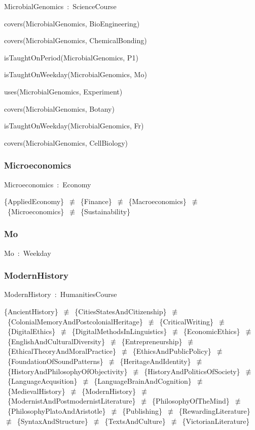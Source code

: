 \documentclass{article}
\begin{document}
MicrobialGenomics~:~ScienceCourse

covers(MicrobialGenomics, BioEngineering)

covers(MicrobialGenomics, ChemicalBonding)

isTaughtOnPeriod(MicrobialGenomics, P1)

isTaughtOnWeekday(MicrobialGenomics, Mo)

uses(MicrobialGenomics, Experiment)

covers(MicrobialGenomics, Botany)

isTaughtOnWeekday(MicrobialGenomics, Fr)

covers(MicrobialGenomics, CellBiology)

\subsubsection*{Microeconomics}

Microeconomics~:~Economy

\{AppliedEconomy\}~\ensuremath{\not\equiv}~\{Finance\}~\ensuremath{\not\equiv}~\{Macroeconomics\}~\ensuremath{\not\equiv}~\{Microeconomics\}~\ensuremath{\not\equiv}~\{Sustainability\}

\subsubsection*{Mo}

Mo~:~Weekday

\subsubsection*{ModernHistory}

ModernHistory~:~HumanitiesCourse

\{AncientHistory\}~\ensuremath{\not\equiv}~\{CitiesStatesAndCitizenship\}~\ensuremath{\not\equiv}~\{ColonialMemoryAndPostcolonialHeritage\}~\ensuremath{\not\equiv}~\{CriticalWriting\}~\ensuremath{\not\equiv}~\{DigitalEthics\}~\ensuremath{\not\equiv}~\{DigitalMethodsInLinguistics\}~\ensuremath{\not\equiv}~\{EconomicEthics\}~\ensuremath{\not\equiv}~\{EnglishAndCulturalDiversity\}~\ensuremath{\not\equiv}~\{Entrepreneurship\}~\ensuremath{\not\equiv}~\{EthicalTheoryAndMoralPractice\}~\ensuremath{\not\equiv}~\{EthicsAndPublicPolicy\}~\ensuremath{\not\equiv}~\{FoundationOfSoundPatterns\}~\ensuremath{\not\equiv}~\{HeritageAndIdentity\}~\ensuremath{\not\equiv}~\{HistoryAndPhilosophyOfObjectivity\}~\ensuremath{\not\equiv}~\{HistoryAndPoliticsOfSociety\}~\ensuremath{\not\equiv}~\{LanguageAcqusition\}~\ensuremath{\not\equiv}~\{LanguageBrainAndCognition\}~\ensuremath{\not\equiv}~\{MedievalHistory\}~\ensuremath{\not\equiv}~\{ModernHistory\}~\ensuremath{\not\equiv}~\{ModernistAndPostmodernistLiterature\}~\ensuremath{\not\equiv}~\{PhilosophyOfTheMind\}~\ensuremath{\not\equiv}~\{PhilosophyPlatoAndAristotle\}~\ensuremath{\not\equiv}~\{Publishing\}~\ensuremath{\not\equiv}~\{RewardingLiterature\}~\ensuremath{\not\equiv}~\{SyntaxAndStructure\}~\ensuremath{\not\equiv}~\{TextsAndCulture\}~\ensuremath{\not\equiv}~\{VictorianLiterature\}
\end{document}
